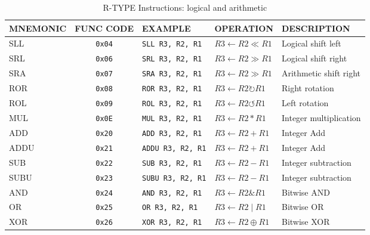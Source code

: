 \begin{table}[H]
\begin{tabularx}{\textwidth}{|l|c|l|l|X|}
    \hline
    MNEMONIC & FUNC CODE & EXAMPLE & OPERATION & DESCRIPTION \\ 
    \hline
    SLL & \texttt{0x04} & \texttt{SLL R3, R2, R1} & $R3 \leftarrow R2 \ll R1$ & Logical shift left\\ 
    \hline
    SRL & \texttt{0x06} & \texttt{SRL R3, R2, R1} & $R3 \leftarrow R2 \gg R1$ & Logical shift right\\ 
    \hline
    SRA & \texttt{0x07} & \texttt{SRA R3, R2, R1} & $R3 \leftarrow R2 \gg R1$ & Arithmetic shift right\\ 
    \hline
    ROR & \texttt{0x08} & \texttt{ROR R3, R2, R1} & $R3 \leftarrow R2 \circlearrowright R1$ & Right rotation\\ 
    \hline
    ROL & \texttt{0x09} & \texttt{ROL R3, R2, R1} & $R3 \leftarrow R2 \circlearrowleft R1$ & Left rotation\\ 
    \hline
    MUL & \texttt{0x0E} & \texttt{MUL R3, R2, R1} & $R3 \leftarrow R2 * R1$ & Integer multiplication\\ 
    \hline
    ADD & \texttt{0x20} & \texttt{ADD R3, R2, R1} & $R3 \leftarrow R2 + R1$ & Integer Add\\ 
    \hline
    ADDU & \texttt{0x21} & \texttt{ADDU R3, R2, R1} & $R3 \leftarrow R2 + R1$ & Integer Add\\ 
    \hline
    SUB & \texttt{0x22} & \texttt{SUB R3, R2, R1} & $R3 \leftarrow R2 - R1$ & Integer subtraction\\ 
    \hline
    SUBU & \texttt{0x23} & \texttt{SUBU R3, R2, R1} & $R3 \leftarrow R2 - R1$ & Integer subtraction\\ 
    \hline
    AND & \texttt{0x24} & \texttt{AND R3, R2, R1} & $R3 \leftarrow R2 \texttt{\&} R1$ & Bitwise AND\\ 
    \hline
    OR & \texttt{0x25} & \texttt{OR R3, R2, R1} & $R3 \leftarrow R2 \mid R1$ & Bitwise OR\\ 
    \hline
    XOR & \texttt{0x26} & \texttt{XOR R3, R2, R1} & $R3 \leftarrow R2 \oplus R1$ & Bitwise XOR\\ 
    \hline
\end{tabularx}
\caption{R-TYPE Instructions: logical and arithmetic}
\label{table:r_type}
\end{table}

